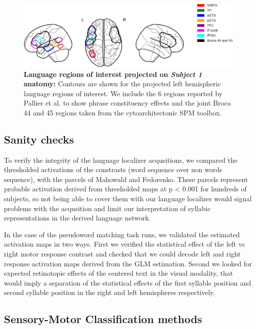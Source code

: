 \begin{figure}[hptb]
\centering
\includegraphics[width=1.0 \linewidth]{figures/part_II/language_example_img_with_legend.pdf}
\caption{\textbf{Language regions of interest projected on \emph{Subject 1} anatomy:}
Contours are shown for the projected left hemispheric language regions of interest. We include the 6 regions reported by Pallier et al. to show phrase constituency effects and the joint Broca 44 and 45 regions taken from the cytoarchitectonic SPM toolbox.
}
\label{fig:langrois_example_img}
\end{figure}


\subsection{Sanity checks}

To verify the integrity of the language localizer acqusitions, we compared the thresholded activations of the constrasts (word sequence over non words sequence), with the parcels of Mahowald and Fedorenko.
These parcels represent probable activation derived from thresholded maps at p < 0.001 for hundreds of subjects, so not being able to cover them with our language localizer would signal problems with the acqusition and limit our interpretation of syllabic representations in the derived language network.

In the case of the pseudoword matching task runs, we validated the estimated activation maps in two ways.
First we verified the statistical effect of the left vs right motor response contrast and checked that we could decode left and right response activation maps derived from the GLM estimation.
Second we looked for expected retinotopic effects of the centered text in the visual modality, that would imply a separation of the statistical effects of the first syllable position and second syllable position in the right and left hemispheres respectively.


\subsection{Sensory-Motor Classification methods}

